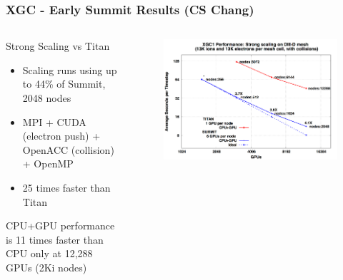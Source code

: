 \documentclass[aspectratio=169]{beamer}
\begin{document}
\begin{frame}
  \frametitle{XGC - Early Summit Results (CS Chang)}
  \begin{columns}
    \begin{column}{0.5\textwidth}
      Strong Scaling vs Titan
      \begin{itemize}
        \item Scaling runs using up to 44\% of Summit, 2048 nodes
        \item MPI + CUDA (electron push) + OpenACC (collision) + OpenMP
        \item 25 times faster than Titan %
      \end{itemize}
      CPU+GPU performance is 11 times faster than CPU only at 12,288 GPUs (2Ki
      nodes)
    \end{column}
    \begin{column}{0.5\textwidth}
      \begin{figure}
        \centering
        \includegraphics[width=\textwidth]{figures/xgcStrongScaling.png}
      \end{figure}
    \end{column}
  \end{columns}
\end{frame}
\end{document}

